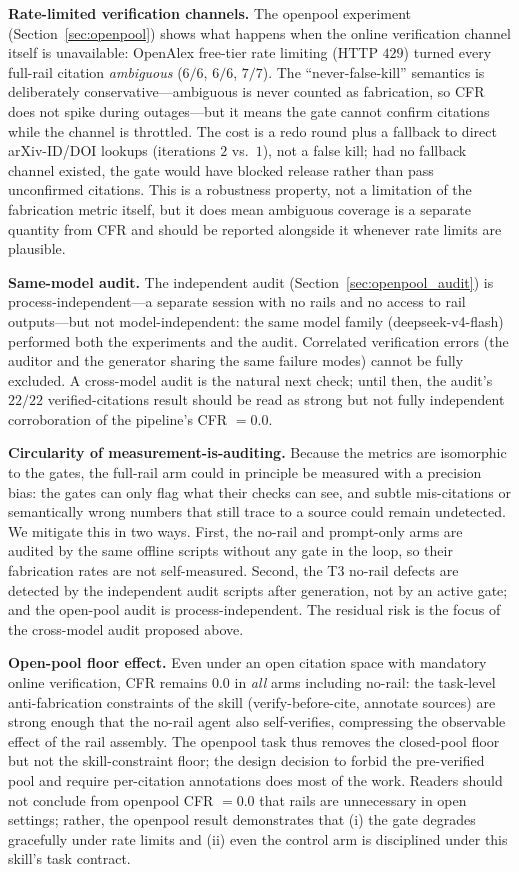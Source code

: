 \documentclass[10pt,twocolumn]{article}
\begin{document}
\textbf{Rate-limited verification channels.} The openpool experiment (Section~\ref{sec:openpool}) shows what happens when the online verification channel itself is unavailable: OpenAlex free-tier rate limiting (HTTP $429$) turned every full-rail citation \emph{ambiguous} ($6/6$, $6/6$, $7/7$). The ``never-false-kill'' semantics is deliberately conservative---ambiguous is never counted as fabrication, so CFR does not spike during outages---but it means the gate cannot confirm citations while the channel is throttled. The cost is a redo round plus a fallback to direct arXiv-ID/DOI lookups (iterations $2$ vs.\ $1$), not a false kill; had no fallback channel existed, the gate would have blocked release rather than pass unconfirmed citations. This is a robustness property, not a limitation of the fabrication metric itself, but it does mean ambiguous coverage is a separate quantity from CFR and should be reported alongside it whenever rate limits are plausible.

\textbf{Same-model audit.} The independent audit (Section~\ref{sec:openpool_audit}) is process-independent---a separate session with no rails and no access to rail outputs---but not model-independent: the same model family (deepseek-v4-flash) performed both the experiments and the audit. Correlated verification errors (the auditor and the generator sharing the same failure modes) cannot be fully excluded. A cross-model audit is the natural next check; until then, the audit's $22/22$ verified-citations result should be read as strong but not fully independent corroboration of the pipeline's CFR $= 0.0$.

\textbf{Circularity of measurement-is-auditing.} Because the metrics are isomorphic to the gates, the full-rail arm could in principle be measured with a precision bias: the gates can only flag what their checks can see, and subtle mis-citations or semantically wrong numbers that still trace to a source could remain undetected. We mitigate this in two ways. First, the no-rail and prompt-only arms are audited by the same offline scripts without any gate in the loop, so their fabrication rates are not self-measured. Second, the T3 no-rail defects are detected by the independent audit scripts after generation, not by an active gate; and the open-pool audit is process-independent. The residual risk is the focus of the cross-model audit proposed above.

\textbf{Open-pool floor effect.} Even under an open citation space with mandatory online verification, CFR remains $0.0$ in \emph{all} arms including no-rail: the task-level anti-fabrication constraints of the skill (verify-before-cite, annotate sources) are strong enough that the no-rail agent also self-verifies, compressing the observable effect of the rail assembly. The openpool task thus removes the closed-pool floor but not the skill-constraint floor; the design decision to forbid the pre-verified pool and require per-citation annotations does most of the work. Readers should not conclude from openpool CFR $= 0.0$ that rails are unnecessary in open settings; rather, the openpool result demonstrates that (i) the gate degrades gracefully under rate limits and (ii) even the control arm is disciplined under this skill's task contract.
\end{document}
